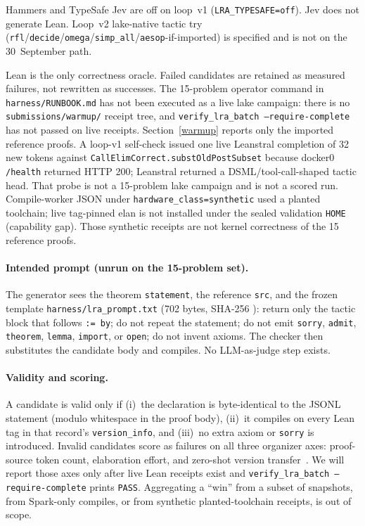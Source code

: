 \documentclass{article}
\begin{document}
Hammers and TypeSafe Jev are off on loop~v1 (\texttt{LRA\_TYPESAFE=off}). Jev does not generate Lean. Loop~v2 lake-native tactic try (\texttt{rfl}/\texttt{decide}/\texttt{omega}/\texttt{simp\_all}/\texttt{aesop}-if-imported) is specified and is not on the 30~September path.

Lean is the only correctness oracle. Failed candidates are retained as measured failures, not rewritten as successes. The 15-problem operator command in \texttt{harness/RUNBOOK.md} has not been executed as a live lake campaign: there is no \texttt{submissions/warmup/} receipt tree, and \texttt{verify\_lra\_batch --require-complete} has not passed on live receipts. Section~\ref{warmup} reports only the imported reference proofs. A loop-v1 self-check issued one live Leanstral completion of 32 new tokens against \texttt{CallElimCorrect.substOldPostSubset} because docker0 \texttt{/health} returned HTTP 200; Leanstral returned a DSML/tool-call-shaped tactic head. That probe is not a 15-problem lake campaign and is not a scored run. Compile-worker JSON under \texttt{hardware\_class=synthetic} used a planted toolchain; live tag-pinned elan is not installed under the sealed validation \texttt{HOME} (capability gap). Those synthetic receipts are not kernel correctness of the 15 reference proofs.

\paragraph{Intended prompt (unrun on the 15-problem set).} The generator sees the theorem \texttt{statement}, the reference \texttt{src}, and the frozen template \texttt{harness/lra\_prompt.txt} (702 bytes, SHA-256 ): return only the tactic block that follows \texttt{:= by}; do not repeat the statement; do not emit \texttt{sorry}, \texttt{admit}, \texttt{theorem}, \texttt{lemma}, \texttt{import}, or \texttt{open}; do not invent axioms. The checker then substitutes the candidate body and compiles. No LLM-as-judge step exists.

\paragraph{Validity and scoring.} A candidate is valid only if (i)~the declaration is byte-identical to the JSONL statement (modulo whitespace in the proof body), (ii)~it compiles on every Lean tag in that record's \texttt{version\_info}, and (iii)~no extra axiom or \texttt{sorry} is introduced. Invalid candidates score as failures on all three organizer axes: proof-source token count, elaboration effort, and zero-shot version transfer~\cite{vericodegen2026}. We will report those axes only after live Lean receipts exist and \texttt{verify\_lra\_batch --require-complete} prints \texttt{PASS}. Aggregating a ``win'' from a subset of snapshots, from Spark-only compiles, or from synthetic planted-toolchain receipts, is out of scope.
\end{document}
